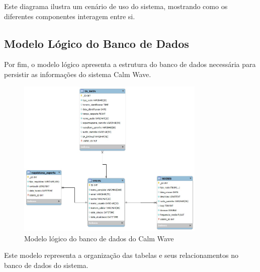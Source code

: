 \documentclass[
  a4paper,
  12pt,
  english,
  brazilian,
]{article}
\begin{document}
Este diagrama ilustra um cenário de uso do sistema, mostrando como os diferentes componentes interagem entre si.

\subsection*{Modelo Lógico do Banco de Dados}

Por fim, o modelo lógico apresenta a estrutura do banco de dados necessária para persistir as informações do sistema Calm Wave.

\begin{figure}[H]
\centering
\caption{Modelo lógico do banco de dados do Calm Wave}%
\label{fig:modelo-logico}
\includegraphics[width=0.8\textwidth]{Logos/Modelo_logico_banco.jpg}
\end{figure}

Este modelo representa a organização das tabelas e seus relacionamentos no banco de dados do sistema.
\end{document}
